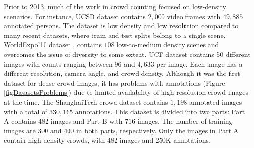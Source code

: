 \documentclass[runningheads]{llncs}
\begin{document}
Prior to 2013, much of the work in crowd counting focused on low-density scenarios. For instance, UCSD dataset \cite{vasconcelos-cvpr08} contains $2,000$ video frames with $49,885$ annotated persons. The dataset is low density and low resolution compared to many recent datasets, where train and test splits belong to a single scene. WorldExpo'10 dataset \cite{zhang2015cross}, contains $108$ low-to-medium density scenes and overcomes the issue of diversity to some extent. UCF dataset \cite{idrees2013multi} contains 50 different images with counts ranging between $96$ and $4,633$ per image. Each image has a different resolution, camera angle, and crowd density. Although it was the first dataset for dense crowd images, it has problems with annotations (Figure \ref{figDatasetsProblems}) due to limited availability of high-resolution crowd images at the time. The ShanghaiTech crowd dataset \cite{zhang2016single} contains $1,198$ annotated images with a total of $330,165$ annotations. This dataset is divided into two parts: Part A contains $482$ images and Part B with $716$ images. The number of training images are $300$ and $400$ in both parts, respectively. Only the images in Part A contain high-density crowds, with $482$ images and $250$K annotations.

\renewcommand{\multirowsetup}{\centering}
\begin{table*}[t]
\centering
\caption{{Summary of statistics of different datasets. UCF\_CC\_50 (44MB); WorldExpo'10 (325MB); ShanghaiTech\_A (67MB); and the proposed UCF-QNRF Dataset (4.33GB).}}
\label{tabDatasets}
\end{table*}
\end{document}
